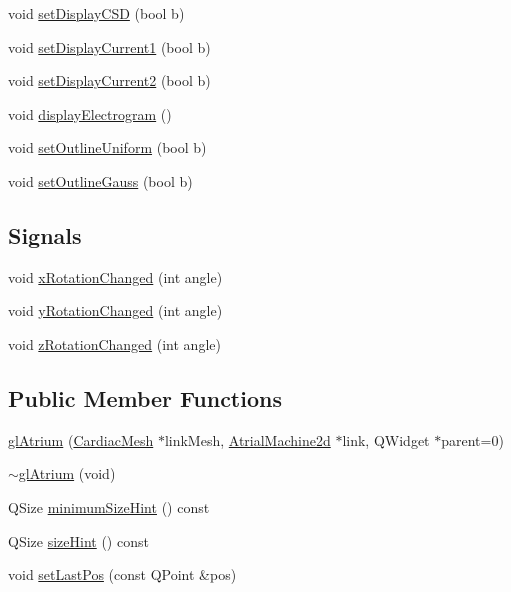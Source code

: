 \begin{DoxyCompactItemize}
void \hyperlink{classgl_atrium_a0d8ebb9fd216ef5ffa626071139ee26d}{set\+Display\+C\+S\+D} (bool b)
\item 
void \hyperlink{classgl_atrium_a7a56112f029a3a8f6943841735a12a76}{set\+Display\+Current1} (bool b)
\item 
void \hyperlink{classgl_atrium_a22f57b77572b7535269afc46a4126a53}{set\+Display\+Current2} (bool b)
\item 
void \hyperlink{classgl_atrium_a37275a26952f199c55df1ed3b38b6887}{display\+Electrogram} ()
\item 
void \hyperlink{classgl_atrium_a1b033aa6b6df0e8f73c0199ddfea108f}{set\+Outline\+Uniform} (bool b)
\item 
void \hyperlink{classgl_atrium_a2763b82810f80bd56ac251971637df46}{set\+Outline\+Gauss} (bool b)
\end{DoxyCompactItemize}
\subsection*{Signals}
\begin{DoxyCompactItemize}
\item 
void \hyperlink{classgl_atrium_add3c45ba71308914e62ac5f07d9dbce4}{x\+Rotation\+Changed} (int angle)
\item 
void \hyperlink{classgl_atrium_a12abcdbba73ff41ea8efdbbdcdbdcb6c}{y\+Rotation\+Changed} (int angle)
\item 
void \hyperlink{classgl_atrium_a71703a9bcfb404b9aa1bdab789573c7e}{z\+Rotation\+Changed} (int angle)
\end{DoxyCompactItemize}
\subsection*{Public Member Functions}
\begin{DoxyCompactItemize}
\item 
\hyperlink{classgl_atrium_a68d308b0209b6111bbbcbb56b1a5e10c}{gl\+Atrium} (\hyperlink{class_cardiac_mesh}{Cardiac\+Mesh} $\ast$link\+Mesh, \hyperlink{class_atrial_machine2d}{Atrial\+Machine2d} $\ast$link, Q\+Widget $\ast$parent=0)
\item 
\hyperlink{classgl_atrium_aab01fe62e0f7734e3b91b42a11d32db7}{$\sim$gl\+Atrium} (void)
\item 
Q\+Size \hyperlink{classgl_atrium_acf3a401dfd3ca09d8dcb36886f306ba9}{minimum\+Size\+Hint} () const 
\item 
Q\+Size \hyperlink{classgl_atrium_a0e7fc813e7c9ae4d47317109815b9705}{size\+Hint} () const 
\item 
void \hyperlink{classgl_atrium_aef6b55dd9c8a5b542c034d7bb8e6d319}{set\+Last\+Pos} (const Q\+Point \&pos)
\end{DoxyCompactItemize}
